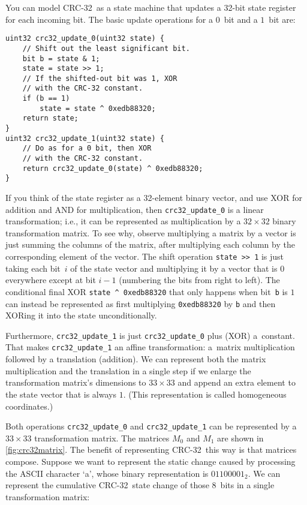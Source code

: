 \documentclass[letterpaper,twocolumn,10pt]{article}
\newcommand{\CRC}{\mbox{CRC-32}}
\begin{document}
You can model \CRC\ as a state machine that updates a 32-bit state register
for each incoming bit.
The basic update operations for a $0$~bit and a $1$~bit are:
{
\small
\begin{verbatim}
uint32 crc32_update_0(uint32 state) {
    // Shift out the least significant bit.
    bit b = state & 1;
    state = state >> 1;
    // If the shifted-out bit was 1, XOR
    // with the CRC-32 constant.
    if (b == 1)
        state = state ^ 0xedb88320;
    return state;
}
uint32 crc32_update_1(uint32 state) {
    // Do as for a 0 bit, then XOR
    // with the CRC-32 constant.
    return crc32_update_0(state) ^ 0xedb88320;
}
\end{verbatim}
}

If you think of the state register as a 32-element binary vector,
and use XOR for addition and AND for multiplication, then
\texttt{crc32\_update\_0} is a linear transformation;
i.e., it can be represented as multiplication by a
$32\times32$ binary transformation matrix.
To see why, observe multiplying a matrix by a vector
is just summing the columns of the matrix,
after multiplying each column by the corresponding element of the vector.
The shift operation \texttt{state~>{}>~1}
is just taking each bit~$i$ of the state vector
and multiplying it by a vector that is $0$ everywhere except at bit $i-1$
(numbering the bits from right to left).
The conditional final XOR \texttt{state~\^~0xedb88320}
that only happens when bit~\texttt{b} is $1$
can instead be represented as first multiplying
\texttt{0xedb88320} by \texttt{b}
and then XORing it into the state unconditionally.

Furthermore, \texttt{crc32\_update\_1} is just
\texttt{crc32\_update\_0} plus (XOR) a~constant.
That makes \texttt{crc32\_update\_1} an
affine transformation:
a~matrix multiplication followed by a translation (addition).
We can represent both the matrix multiplication and the translation
in a single step
if we enlarge the transformation matrix's dimensions to $33\times33$
and append an extra element to the state vector that is always $1$.
(This representation is called
homogeneous coordinates.)

Both operations \texttt{crc32\_update\_0} and \texttt{crc32\_update\_1}
can be represented by a $33\times 33$ transformation matrix.
The matrices $M_0$ and $M_1$ are shown in \autoref{fig:crc32matrix}.
The benefit of representing \CRC\ this way is that matrices compose.
Suppose we want to represent the static change caused by processing
the ASCII character `a', whose binary representation is
$01100001_2$.
We can represent the cumulative \CRC\ state change of those 8~bits
in a single transformation matrix:
\end{document}
